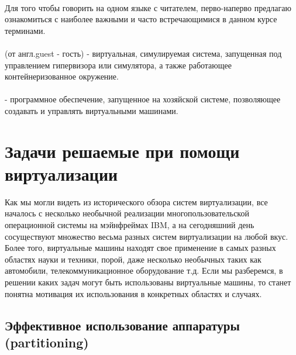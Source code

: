 \documentclass[14pt, a4paper]{article}
\begin{document}
\\

\noindent Для того чтобы говорить на одном языке с читателем, перво-наперво предлагаю
ознакомиться с наиболее важными и часто встречающимися в данном курсе
терминами.\\

\\

\noindent {} (от англ.guest - гость) - виртуальная, симулируемая система,
запущенная под управлением гипервизора или симулятора, а также работающее
контейнеризованное окружение.\\

\\

\noindent {} - программное обеспечение, запущенное
на хозяйской системе, позволяющее создавать и управлять виртуальными машинами.

\section*{Задачи решаемые при помощи виртуализации}

Как мы могли видеть из исторического обзора систем виртуализации, все началось с
несколько необычной реализации многопользовательской операционной системы на
мэйнфреймах IBM, а на сегодняшний день сосуществуют множество весьма разных
систем виртуализации на любой вкус. Более того, виртуальные машины находят свое
применение в самых разных областях науки и техники, порой, даже несколько
необычных таких как автомобили, телекоммуникационное оборудование т.д. Если мы
разберемся, в решении каких задач могут быть использованы виртуальные машины, то
станет понятна мотивация их использования в конкретных областях и случаях.

\subsection*{Эффективное использование аппаратуры (partitioning)}
\end{document}
